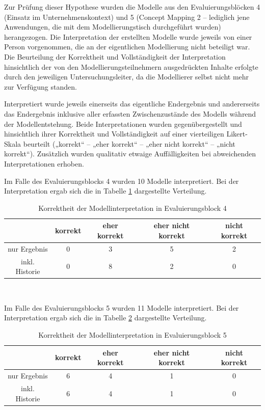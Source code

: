 Zur Prüfung dieser Hypothese wurden die Modelle aus den Evaluierungsblöcken 4 (Einsatz im Unternehmenskontext) und 5 (Concept Mapping 2 -- lediglich jene Anwendungen, die mit dem Modellierungstisch durchgeführt wurden) herangezogen. Die Interpretation der erstellten Modelle wurde jeweils von einer Person vorgenommen, die an der eigentlichen Modellierung nicht beteiligt war. Die Beurteilung der Korrektheit und Vollständigkeit der Interpretation hinsichtlich der von den Modellierungsteilnehmern ausgedrückten Inhalte erfolgte durch den jeweiligen Untersuchungsleiter, da die Modellierer selbst nicht mehr zur Verfügung standen.

Interpretiert wurde jeweils einerseits das eigentliche Endergebnis und andererseits das Endergebnis inklusive aller erfassten Zwischenzustände des Modells während der Modellentstehung. Beide Interpretationen wurden gegenübergestellt und hinsichtlich ihrer Korrektheit und Vollständigkeit auf einer vierteiligen Likert-Skala beurteilt („korrekt“ -- „eher korrekt“ -- „eher nicht korrekt“ -- „nicht korrekt“). Zusätzlich wurden qualitativ etwaige Auffälligkeiten bei abweichenden Interpretationen erhoben.

Im Falle des Evaluierungsblocks 4 wurden 10 Modelle interpretiert. Bei der Interpretation ergab sich die in Tabelle \ref{tab:interpretation_block4} dargestellte Verteilung.

\begin{table}[htbp]
	\centering
	\caption{Korrektheit der Modellinterpretation in Evaluierungsblock 4}
\begin{tabular}{| c || c | c | c | c |}
  \hline
   & korrekt & eher korrekt & eher nicht korrekt & nicht korrekt \\ \hline
   nur Ergebnis   & 0 & 3 & 5 & 2 \\ 
   inkl. Historie & 0 & 8 & 2 & 0 \\ \hline
\end{tabular} \\
	\label{tab:interpretation_block4}
\end{table}

Im Falle des Evaluierungsblocks 5 wurden 11 Modelle interpretiert. Bei der Interpretation ergab sich die in Tabelle \ref{tab:interpretation_block5} dargestellte Verteilung.

\begin{table}[htbp]
	\centering
	\caption{Korrektheit der Modellinterpretation in Evaluierungsblock 5}
\begin{tabular}{| c || c | c | c | c |}
  \hline
   & korrekt & eher korrekt & eher nicht korrekt & nicht korrekt \\ \hline
   nur Ergebnis   & 6 & 4 & 1 & 0 \\ 
   inkl. Historie & 6 & 4 & 1 & 0 \\ \hline
\end{tabular} \\
	\label{tab:interpretation_block5}
\end{table}

